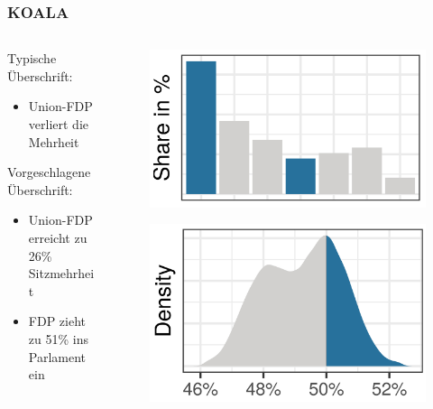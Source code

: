 \documentclass[aspectratio=169,xcolor=dvipsnames]{beamer}
\begin{document}
\begin{frame}
\frametitle{KOALA}
\begin{columns}
\begin{column}{0.4\textwidth}
Typische Überschrift:
\begin{itemize}
\item \glqq Union-FDP verliert die Mehrheit\grqq{}
\end{itemize}

\vspace{1cm}
Vorgeschlagene Überschrift:
\begin{itemize}
\item \glqq Union-FDP erreicht zu 26\% Sitzmehrheit \grqq{}
\item \glqq FDP zieht zu 51\% ins Parlament ein \grqq{}
\end{itemize}

\end{column}
\begin{column}{0.6\textwidth}
\begin{figure}
\includegraphics[height=0.35\textheight]{partyshare}
\end{figure}
\begin{figure}
\includegraphics[height=0.40\textheight]{poe}
\end{figure}
\end{column}
\end{columns}
\end{frame}
\end{document}
